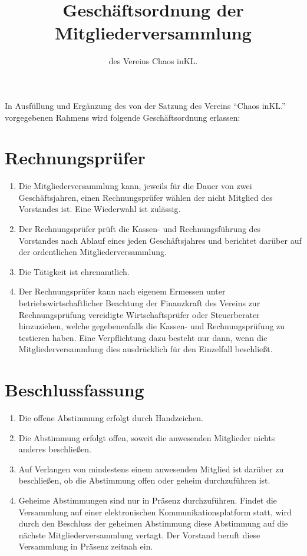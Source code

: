 \documentclass[a4paper, 12pt]{scrartcl}
\begin{document}
\title{Geschäftsordnung der Mitgliederversammlung}
\subtitle{des Vereins Chaos inKL.}
\author{}
\date{}

\maketitle

In Ausfüllung und Ergänzung des von der Satzung des Vereins "`Chaos
inKL."' vorgegebenen Rahmens wird folgende Geschäftsordnung erlassen:

\section{Rechnungsprüfer}
\begin{enumerate}
	\item Die Mitgliederversammlung kann, jeweils für die Dauer von zwei
Geschäftsjahren, einen Rechnungsprüfer wählen der nicht Mitglied des
Vorstandes ist. Eine Wiederwahl ist zulässig.
	\item Der Rechnungsprüfer prüft die Kassen- und Rechnungsführung des
Vorstandes nach Ablauf eines jeden Geschäftsjahres und berichtet darüber
auf der ordentlichen Mitgliederversammlung.
	\item Die Tätigkeit ist ehrenamtlich.
	\item Der Rechnungsprüfer kann nach eigenem Ermessen unter
betriebswirtschaftlicher Beachtung der Finanzkraft des Vereins zur
Rechnungsprüfung vereidigte Wirtschaftsprüfer oder Steuerberater
hinzuziehen, welche gegebenenfalls die Kassen- und Rechnungsprüfung zu
testieren haben. Eine Verpflichtung dazu besteht nur dann, wenn die
Mitgliederversammlung dies ausdrücklich für den Einzelfall beschließt.
\end{enumerate}

\section{Beschlussfassung}
\begin{enumerate}
	\item Die offene Abstimmung erfolgt durch Handzeichen.
	\item Die Abstimmung erfolgt offen, soweit die anwesenden Mitglieder nichts anderes beschließen.
	\item Auf Verlangen von mindestens einem anwesenden Mitglied ist darüber zu beschließen, ob die Abstimmung offen oder geheim durchzuführen ist.
	\item Geheime Abstimmungen sind nur in Präsenz durchzuführen.  Findet die Versammlung auf einer elektronischen Kommunikationsplatform statt, wird durch den Beschluss der geheimen Abstimmung diese Abstimmung auf die nächste Mitgliederversammlung vertagt.  Der Vorstand beruft diese Versammlung in Präsenz zeitnah ein.
\end{enumerate}
\end{document}
